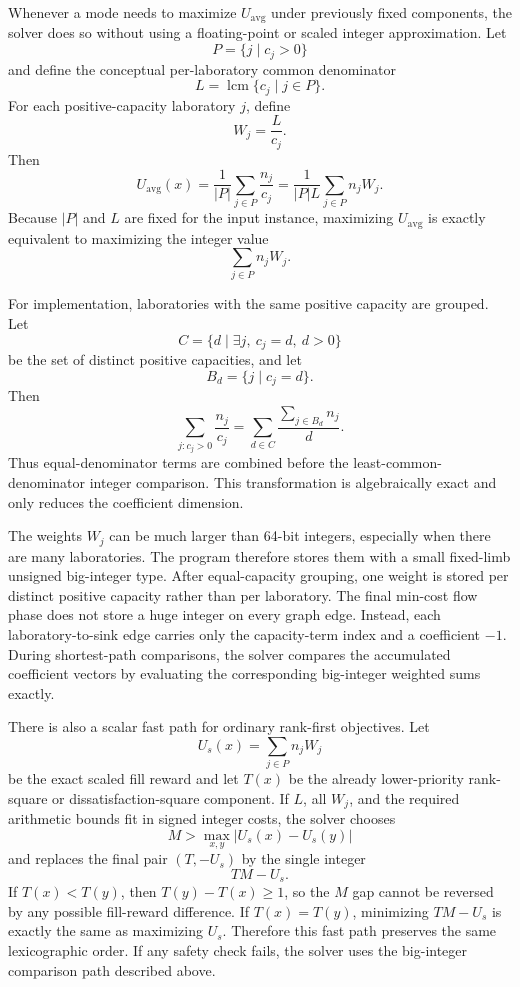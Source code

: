 \documentclass[11pt,a4paper]{article}
\begin{document}
Whenever a mode needs to maximize \(U_{\mathrm{avg}}\) under previously fixed
components, the solver does so without using a floating-point or scaled
integer approximation.  Let
\[
  P=\{j\mid c_j>0\}
\]
and define the conceptual per-laboratory common denominator
\[
  L=\operatorname{lcm}\{c_j\mid j\in P\}.
\]
For each positive-capacity laboratory \(j\), define
\[
  W_j=\frac{L}{c_j}.
\]
Then
\[
  U_{\mathrm{avg}}(x)
  =\frac{1}{|P|}\sum_{j\in P}\frac{n_j}{c_j}
  =\frac{1}{|P|L}\sum_{j\in P}n_jW_j.
\]
Because \(|P|\) and \(L\) are fixed for the input instance, maximizing
\(U_{\mathrm{avg}}\) is exactly equivalent to maximizing the integer value
\[
  \sum_{j\in P} n_j W_j.
\]

For implementation, laboratories with the same positive capacity are grouped.
Let
\[
  C=\{d\mid \exists j,\ c_j=d,\ d>0\}
\]
be the set of distinct positive capacities, and let
\[
  B_d=\{j\mid c_j=d\}.
\]
Then
\[
  \sum_{j:c_j>0}\frac{n_j}{c_j}
  =
  \sum_{d\in C}\frac{\sum_{j\in B_d}n_j}{d}.
\]
Thus equal-denominator terms are combined before the least-common-denominator
integer comparison.  This transformation is algebraically exact and only
reduces the coefficient dimension.

The weights \(W_j\) can be much larger than 64-bit integers, especially when
there are many laboratories.  The program therefore stores them with a small
fixed-limb unsigned big-integer type.  After equal-capacity grouping, one
weight is stored per distinct positive capacity rather than per laboratory.
The final min-cost flow phase does not store a huge integer on every graph
edge.  Instead, each laboratory-to-sink edge carries only the capacity-term
index and a coefficient \(-1\).  During shortest-path comparisons, the solver
compares the accumulated coefficient vectors by evaluating the corresponding
big-integer weighted sums exactly.

There is also a scalar fast path for ordinary rank-first objectives.  Let
\[
  U_s(x)=\sum_{j\in P} n_j W_j
\]
be the exact scaled fill reward and let \(T(x)\) be the already lower-priority
rank-square or dissatisfaction-square component.  If \(L\), all \(W_j\), and
the required arithmetic bounds fit in signed integer costs, the solver chooses
\[
  M > \max_{x,y}|U_s(x)-U_s(y)|
\]
and replaces the final pair \((T,-U_s)\) by the single integer
\[
  T M - U_s.
\]
If \(T(x)<T(y)\), then \(T(y)-T(x)\ge 1\), so the \(M\) gap cannot be reversed
by any possible fill-reward difference.  If \(T(x)=T(y)\), minimizing
\(TM-U_s\) is exactly the same as maximizing \(U_s\).  Therefore this fast
path preserves the same lexicographic order.  If any safety check fails, the
solver uses the big-integer comparison path described above.
\end{document}
